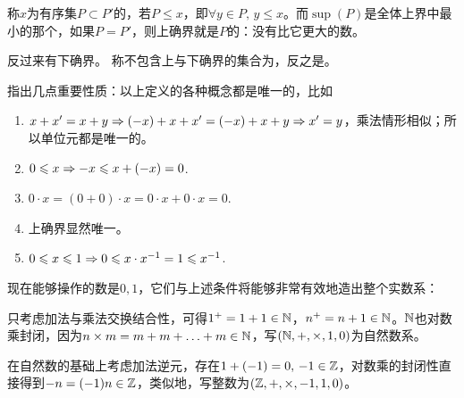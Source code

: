 \begin{definition}[确界，开闭性]
	
	称$x$为有序集$P\subset P'$的，若$P\leqslant x$，即$\forall y\in P,\, y\leqslant x$。而$\sup(P)$是全体上界中最小的那个，如果$P=P'$，则上确界就是$P$的：没有比它更大的数。
	
	反过来有下确界。%
	称不包含上与下确界的集合为，反之是。
	
\end{definition}

\begin{remark}
	
	指出几点重要性质：以上定义的各种概念都是唯一的，比如
	
	\begin{enumerate}
		
		\item $x+x'=x+y\Rightarrow (-x)+x+x'=(-x)+x+y \Rightarrow x'=y$，乘法情形相似；所以单位元都是唯一的。
		
		\item $0\leqslant x \Rightarrow -x\leqslant x+(-x)=0$.
		
		\item $0\cdot x = (0+0)\cdot x = 0\cdot x + 0\cdot x = 0$.
		
		\item 上确界显然唯一。
		
		\item $0\leqslant x\leqslant 1\Rightarrow 0\leqslant x\cdot x^{-1} = 1 \leqslant x^{-1}$.
		
	\end{enumerate}
	
\end{remark}

现在能够操作的数是$0,1$，它们与上述条件将能够非常有效地造出整个实数系：

\begin{definition}[自然数]
	
	只考虑加法与乘法交换结合性，可得$1^+ = 1+1 \in \mathbb{N}$，$n^+ = n+1 \in \mathbb{N}$。$\mathbb{N}$也对数乘封闭，因为$n\times m=m+m+\ldots+m\in\mathbb{N}$，写$(\mathbb{N},+,\times,1,0)$为自然数系。
	
\end{definition}

\begin{definition}[整数]
	
	在自然数的基础上考虑加法逆元，存在$1+(-1)=0,\, -1\in\mathbb{Z}$，对数乘的封闭性直接得到$-n=(-1)n\in\mathbb{Z}$，类似地，写整数为$(\mathbb{Z},+,\times,-1,1,0)$。
	
\end{definition}

